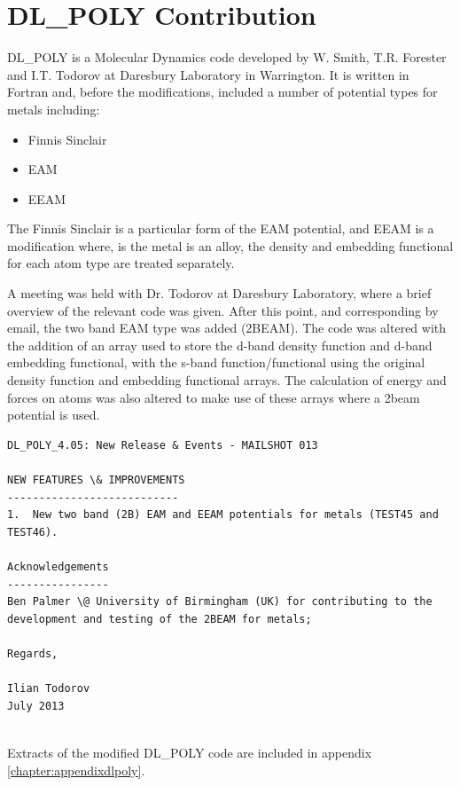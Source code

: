 \section{DL\_POLY Contribution}

DL\_POLY is a Molecular Dynamics code developed by W. Smith, T.R. Forester and I.T. Todorov at Daresbury Laboratory in Warrington. It is written in Fortran and, before the modifications, included a number of potential types for metals including:

\begin{itemize}
\item Finnis Sinclair
\item EAM
\item EEAM
\end{itemize}

The Finnis Sinclair is a particular form of the EAM potential, and EEAM is a modification where, is the metal is an alloy, the density and embedding functional for each atom type are treated separately.

A meeting was held with Dr. Todorov at Daresbury Laboratory, where a brief overview of the relevant code was given.  After this point, and corresponding by email, the two band EAM type was added (2BEAM).  The code was altered with the addition of an array used to store the d-band density function and d-band embedding functional, with the s-band function/functional using the original density function and embedding functional arrays.  The calculation of energy and forces on atoms was also altered to make use of these arrays where a \acrlong{2beam} potential is used.

\begin{lstlisting}[style=sEmail,caption={DL\_POLY 4.05 mailshot extract}]
DL_POLY_4.05: New Release & Events - MAILSHOT 013

NEW FEATURES \& IMPROVEMENTS
--------------------------- 
1.  New two band (2B) EAM and EEAM potentials for metals (TEST45 and TEST46). 

Acknowledgements
----------------
Ben Palmer \@ University of Birmingham (UK) for contributing to the
development and testing of the 2BEAM for metals;

Regards,

Ilian Todorov
July 2013 


\end{lstlisting}

Extracts of the modified DL\_POLY code are included in appendix \ref{chapter:appendixdlpoly}.





























